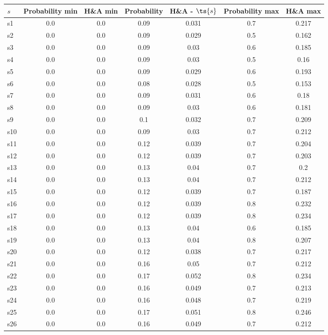 \documentclass{article}
\begin{document}
\noindent\begin{tabular}{|l|c|c|c|c|c|c|}
\hline
$s$& Probability min & H\&A min & Probability & H\&A - $\ts{s}$ & Probability max & H\&A max\\
\hline
s1 &0.0 & 0.0 & 0.09 & 0.031 & 0.7 & 0.217\\
\hline
s2 &0.0 & 0.0 & 0.09 & 0.029 & 0.5 & 0.162\\
\hline
s3 &0.0 & 0.0 & 0.09 & 0.03 & 0.6 & 0.185\\
\hline
s4 &0.0 & 0.0 & 0.09 & 0.03 & 0.5 & 0.16\\
\hline
s5 &0.0 & 0.0 & 0.09 & 0.029 & 0.6 & 0.193\\
\hline
s6 &0.0 & 0.0 & 0.08 & 0.028 & 0.5 & 0.153\\
\hline
s7 &0.0 & 0.0 & 0.09 & 0.031 & 0.6 & 0.18\\
\hline
s8 &0.0 & 0.0 & 0.09 & 0.03 & 0.6 & 0.181\\
\hline
s9 &0.0 & 0.0 & 0.1 & 0.032 & 0.7 & 0.209\\
\hline
s10 &0.0 & 0.0 & 0.09 & 0.03 & 0.7 & 0.212\\
\hline
s11 &0.0 & 0.0 & 0.12 & 0.039 & 0.7 & 0.204\\
\hline
s12 &0.0 & 0.0 & 0.12 & 0.039 & 0.7 & 0.203\\
\hline
s13 &0.0 & 0.0 & 0.13 & 0.04 & 0.7 & 0.2\\
\hline
s14 &0.0 & 0.0 & 0.13 & 0.04 & 0.7 & 0.212\\
\hline
s15 &0.0 & 0.0 & 0.12 & 0.039 & 0.7 & 0.187\\
\hline
s16 &0.0 & 0.0 & 0.12 & 0.039 & 0.8 & 0.232\\
\hline
s17 &0.0 & 0.0 & 0.12 & 0.039 & 0.8 & 0.234\\
\hline
s18 &0.0 & 0.0 & 0.13 & 0.04 & 0.6 & 0.185\\
\hline
s19 &0.0 & 0.0 & 0.13 & 0.04 & 0.8 & 0.207\\
\hline
s20 &0.0 & 0.0 & 0.12 & 0.038 & 0.7 & 0.217\\
\hline
s21 &0.0 & 0.0 & 0.16 & 0.05 & 0.7 & 0.212\\
\hline
s22 &0.0 & 0.0 & 0.17 & 0.052 & 0.8 & 0.234\\
\hline
s23 &0.0 & 0.0 & 0.16 & 0.049 & 0.7 & 0.213\\
\hline
s24 &0.0 & 0.0 & 0.16 & 0.048 & 0.7 & 0.219\\
\hline
s25 &0.0 & 0.0 & 0.17 & 0.051 & 0.8 & 0.246\\
\hline
s26 &0.0 & 0.0 & 0.16 & 0.049 & 0.7 & 0.212\\

\end{tabular}
\end{document}
